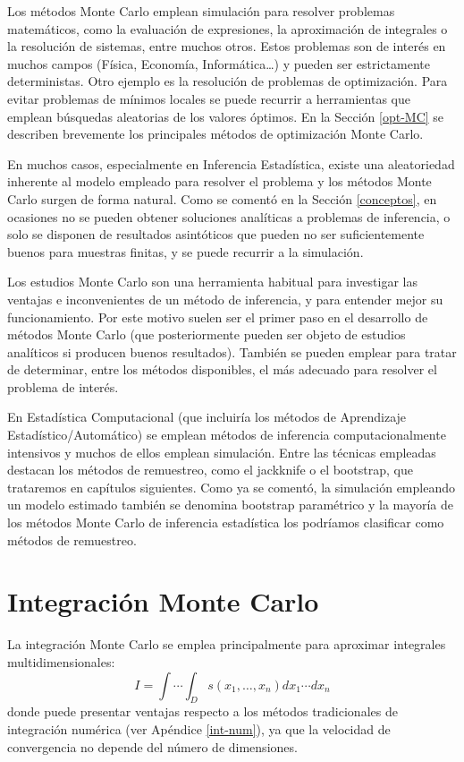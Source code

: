 \documentclass[
  10pt,
]{book}
\theoremstyle{break}
\theoremstyle{nonumberplain}
\begin{document}
Los métodos Monte Carlo emplean simulación para resolver problemas matemáticos, como la evaluación de expresiones, la aproximación de integrales o la resolución de sistemas, entre muchos otros.
Estos problemas son de interés en muchos campos (Física, Economía, Informática\ldots) y pueden ser estrictamente deterministas.
Otro ejemplo es la resolución de problemas de optimización.
Para evitar problemas de mínimos locales se puede recurrir a herramientas que emplean búsquedas aleatorias de los valores óptimos.
En la Sección \ref{opt-MC} se describen brevemente los principales métodos de optimización Monte Carlo.

En muchos casos, especialmente en Inferencia Estadística, existe una aleatoriedad inherente al modelo empleado para resolver el problema y los métodos Monte Carlo surgen de forma natural.
Como se comentó en la Sección \ref{conceptos}, en ocasiones no se pueden obtener soluciones analíticas a problemas de inferencia, o solo se disponen de resultados asintóticos que pueden no ser suficientemente buenos para muestras finitas, y se puede recurrir a la simulación.

Los estudios Monte Carlo son una herramienta habitual para investigar las ventajas e inconvenientes de un método de inferencia, y para entender mejor su funcionamiento.
Por este motivo suelen ser el primer paso en el desarrollo de métodos Monte Carlo (que posteriormente pueden ser objeto de estudios analíticos si producen buenos resultados).
También se pueden emplear para tratar de determinar, entre los métodos disponibles, el más adecuado para resolver el problema de interés.

En Estadística Computacional (que incluiría los métodos de Aprendizaje Estadístico/Automático) se emplean métodos de inferencia computacionalmente intensivos y muchos de ellos emplean simulación.
Entre las técnicas empleadas destacan los métodos de remuestreo, como el jackknife o el bootstrap, que trataremos en capítulos siguientes.
Como ya se comentó, la simulación empleando un modelo estimado también se denomina bootstrap paramétrico y la mayoría de los métodos Monte Carlo de inferencia estadística los podríamos clasificar como métodos de remuestreo.

\hypertarget{int-MC}{%
\section{Integración Monte Carlo}\label{int-MC}}

La integración Monte Carlo se emplea principalmente para aproximar integrales multidimensionales:
\[I = \int \cdots \int _D s\left( x_1,\ldots ,x_n\right) dx_1 \cdots dx_n\]
donde puede presentar ventajas respecto a los métodos tradicionales de integración numérica (ver Apéndice \ref{int-num}), ya que la velocidad de convergencia no depende del número de dimensiones.
\end{document}
